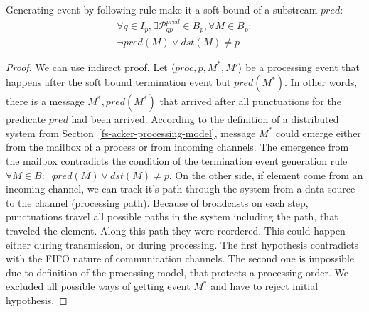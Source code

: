 \begin{lemma}
Generating event by following rule make it a soft bound of a substream $pred$:
\begin{multline}
\forall q \in I_p, \exists \mathcal{P}^{pred}_{qp} \in B_p, \forall M\in B_p : \\ \neg pred(M) \vee dst(M) \ne p
\end{multline}
\end{lemma}

\begin{proof}
We can use indirect proof. Let $\langle proc, p, M^*, M' \rangle$ be a processing event that happens after the soft bound termination event but $pred(M^*)$. In other words, there is a message $M^*, pred(M^*)$ that arrived after all punctuations for the predicate $pred$ had been arrived. According to the definition of a distributed system from Section~\ref{fs-acker-processing-model}, message $M^*$ could emerge either from the mailbox of a process or from incoming channels. The emergence from the mailbox contradicts the condition of the termination event generation rule $\forall M\in B : \neg pred(M) \vee dst(M) \ne p$. On the other side, if element come from an incoming channel, we can track it's path through the system from a data source to the channel (processing path). Because of broadcasts on each step, punctuations travel all possible paths in the system including the path, that traveled the element. Along this path they were reordered. This could happen either during transmission, or during processing. The first hypothesis contradicts with the FIFO nature of communication channels. The second one is impossible due to definition of the processing model, that protects a processing order. We excluded all possible ways of getting event $M^*$ and have to reject initial hypothesis.
\end{proof}


